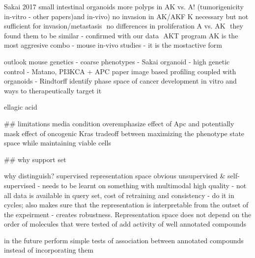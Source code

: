  

Sakai 2017
small intestinal organoids more polyps in AK vs. A! (tumorigenicity in-vitro - other papers)and in-vivo) no invasion in AK/AKF K necessary but not sufficient for invasion/metastasis  no differences in proliferation A vs. AK  they found them to be similar - confirmed with our data  AKT program AK is the most aggresive combo - mouse in-vivo studies - it is the mostactive form

outlook 
mouse genetics - coarse phenotypes  - Sakai
organoid - high genetic control - Matano, PI3KCA + APC paper
image based profiling coupled with organoids - Rindtorff
identify phase space of cancer development in vitro and ways to therapeutically target it

ellagic acid

## limitations
media condition overemphasize effect of Apc and potentially mask effect of oncogenic Kras
tradeoff between maximizing the phenotype state space while maintaining viable cells 



## why support set 

why distinguish? 
supervised representation space obvious 
unsupervised & self-supervised - needs to be learnt on something with multimodal high quality - not all data is available in query set, cost of retraining and consistency - do it in cycles; also makes sure that the representation is interpretable from the outset of the expeirment - creates robustness. Representation space does not depend on the order of  molecules that were tested of 
add activity of well annotated compounds

in the future 
perform simple tests of association between annotated compounds instead of incorporating them


